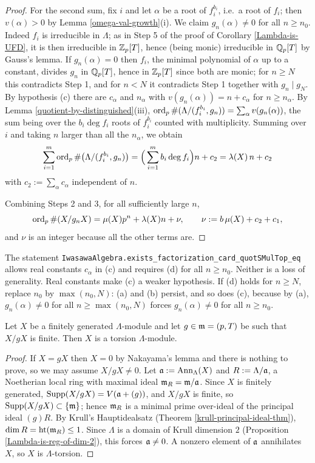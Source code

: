 \begin{proof}
For the second sum, fix $i$ and let $\alpha$ be a root of $f_i^{b_i}$, i.e.~a root
of $f_i$; then $v(\alpha)>0$ by Lemma \ref{omega-val-growth}(i).
We claim $g_n(\alpha)\neq 0$ for all $n\geq n_0$.
Indeed $f_i$ is irreducible in $\Lambda$; as in Step 5 of the proof of
Corollary \ref{Lambda-is-UFD}, it is then irreducible in ${\mathbb {Z}}_p[T]$, hence
(being monic) irreducible in ${\mathbb {Q}}_p[T]$ by Gauss's lemma.
If $g_n(\alpha)=0$ then $f_i$, the minimal polynomial of $\alpha$ up to a
constant, divides $g_n$ in ${\mathbb {Q}}_p[T]$, hence in ${\mathbb {Z}}_p[T]$ since both are monic;
for $n\geq N$ this contradicts Step 1, and for $n<N$ it contradicts Step 1
together with $g_n\mid g_N$.
By hypothesis (c) there are $c_\alpha$ and $n_\alpha$ with
$v(g_n(\alpha))=n+c_\alpha$ for $n\geq n_\alpha$.
By Lemma \ref{quotient-by-distinguished}(iii),
$\operatorname{ord}_p\#(\Lambda/(f_i^{b_i},g_n))=\sum_\alpha v(g_n(\alpha))$, the sum being over
the $b_i\deg f_i$ roots of $f_i^{b_i}$ counted with multiplicity.
Summing over $i$ and taking $n$ larger than all the $n_\alpha$, we obtain
$$\sum_{i=1}^m\operatorname{ord}_p\#\big(\Lambda/(f_i^{b_i},g_n)\big)
=\Big(\sum_{i=1}^mb_i\deg f_i\Big)n+c_2=\lambda(X)\,n+c_2$$
with $c_2:=\sum_\alpha c_\alpha$ independent of $n$.

Combining Steps 2 and 3, for all sufficiently large $n$,
$$\operatorname{ord}_p\#(X/g_nX)=\mu(X)p^n+\lambda(X)n+\nu,\qquad
\nu:=b\,\mu(X)+c_2+c_1,$$
and $\nu$ is an integer because all the other terms are.
\end{proof}

\begin{remark}
The {\Lean} statement
\texttt{IwasawaAlgebra.exists\_factorization\_card\_quotSMulTop\_eq} allows real
constants $c_\alpha$ in (c) and requires (d) for all $n\geq n_0$. Neither is a
loss of generality. Real constants make (c) a weaker hypothesis. If (d) holds
for $n\geq N$, replace $n_0$ by $\max(n_0,N)$: (a) and (b) persist, and so does
(c), because by (a), $g_n(\alpha)\neq0$ for all $n\geq\max(n_0,N)$ forces
$g_n(\alpha)\neq0$ for all $n\geq n_0$.
\end{remark}

\begin{lem}
\label{finite-quotient-implies-torsion}
Let $X$ be a finitely generated $\Lambda$-module and let $g\in{\mathfrak{m}}=(p,T)$ be such
that $X/gX$ is finite. Then $X$ is a torsion $\Lambda$-module.
\end{lem}

\begin{proof}
If $X=gX$ then $X=0$ by Nakayama's lemma and there is nothing to prove, so we may
assume $X/gX\neq 0$.
Let ${\mathfrak{a}}:={\mathrm{Ann}}_\Lambda(X)$ and $R:=\Lambda/{\mathfrak{a}}$, a Noetherian local ring with
maximal ideal ${\mathfrak{m}}_R={\mathfrak{m}}/{\mathfrak{a}}$.
Since $X$ is finitely generated, ${\mathrm{Supp}}(X/gX)=V({\mathfrak{a}}+(g))$, and $X/gX$ is finite,
so ${\mathrm{Supp}}(X/gX)\subset\{{\mathfrak{m}}\}$; hence ${\mathfrak{m}}_R$ is a minimal prime over-ideal of
the principal ideal $(g)R$.
By Krull's Hauptidealsatz (Theorem \ref{krull-principal-ideal-thm}),
$\dim R={\mathrm{ht}}({\mathfrak{m}}_R)\leq 1$.
Since $\Lambda$ is a domain of Krull dimension $2$
(Proposition \ref{Lambda-is-reg-of-dim-2}), this forces ${\mathfrak{a}}\neq 0$.
A nonzero element of ${\mathfrak{a}}$ annihilates $X$, so $X$ is $\Lambda$-torsion.
\end{proof}


